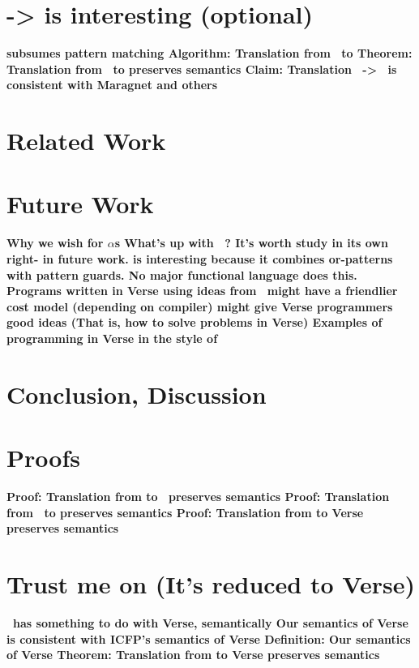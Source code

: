 \documentclass[manuscript,screen,review, 12pt]{acmart}
\begin{document}
\section{\PPlus -> \VMinus is interesting (optional)}
\begin{outline}[enumerate]
    \1 \bf{\VMinus subsumes pattern matching}
    \1 \bf{Algorithm: Translation from \PPlus\ to \VMinus}
    \1 \bf{Theorem: Translation from \PPlus\ to \VMinus preserves semantics}
    \1 \bf{Claim: Translation \PPlus\ -> \D\ is consistent with Maragnet and others}
\end{outline}

\section{Related Work}
\section{Future Work}
\begin{outline}[enumerate]
    \1 \bf{Why we wish for $\alpha$s}
    \1 \bf{What's up with \PPlus\ ? It's worth study in its own right- in future work.}
    \2 \bf{\PPlus is interesting because it combines or-patterns with pattern }
        guards. No major functional language does this. 
    \1 \bf{Programs written in Verse using ideas from \VMinus\ might have a }
    friendlier cost model (depending on compiler)
    \1 \bf{\VMinus might give Verse programmers good ideas }
        (That is, how to solve problems in Verse)
    \2 \bf{Examples of programming in Verse in the style of \VMinus }
\end{outline}

\section{Conclusion, Discussion}

\renewcommand\thesection{\Alph{section}}
\setcounter{section}{0}
\section{Proofs}
\begin{outline}
    \1 \bf{Proof: Translation from \VMinus to \D\ preserves semantics }
    \1 \bf{Proof: Translation from \PPlus\ to \VMinus preserves semantics }
    \1 \bf{Proof: Translation from \VMinus to Verse preserves semantics     }
\end{outline}

\section{Trust me on \VMinus (It's reduced to Verse)}
\begin{outline}
    \1 \bf{\VMinus\ has something to do with Verse, semantically }
    \1 \bf{Our semantics of Verse is consistent with ICFP's semantics of Verse }
    \1 \bf{Definition: Our semantics of Verse}
    \1 \bf{Theorem: Translation from \VMinus to Verse preserves semantics     }
\end{outline}
\end{document}
